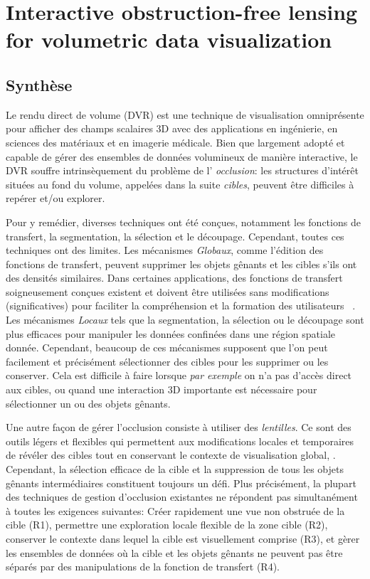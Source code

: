 \chapter{Interactive obstruction-free lensing for volumetric data visualization}
\label{lensing}

\section{Synthèse}

Le rendu direct de volume (DVR) est une technique de visualisation omniprésente pour afficher des champs scalaires 3D avec des applications en ingénierie, en sciences des matériaux et en imagerie médicale. Bien que largement adopté et capable de gérer des ensembles de données volumineux de manière interactive, le DVR souffre intrinsèquement du problème de l' \emph{occlusion}: les structures d’intérêt situées au fond du volume, appelées dans la suite \emph{cibles}, peuvent être difficiles à repérer et/ou explorer.


Pour y remédier, diverses techniques ont été conçues, notamment les fonctions de transfert, la segmentation, la sélection et le découpage. Cependant, toutes ces techniques ont des limites. Les mécanismes \emph{Globaux}, comme l'édition des fonctions de transfert, peuvent supprimer les objets gênants et les cibles s'ils ont des densités similaires. Dans certaines applications, des fonctions de transfert soigneusement conçues existent et doivent être utilisées sans modifications (significatives) pour faciliter la compréhension et la formation des utilisateurs \, \cite{4276082}. Les mécanismes \emph{Locaux} tels que la segmentation, la sélection ou le découpage sont plus efficaces pour manipuler les données confinées dans une région spatiale donnée. Cependant, beaucoup de ces mécanismes supposent que l'on peut facilement et précisément sélectionner des cibles pour les supprimer ou les conserver. Cela est difficile à faire lorsque \emph{par exemple} on n’a pas d’accès direct aux cibles, ou quand une interaction 3D importante est nécessaire pour sélectionner un ou des objets gênants.

Une autre façon de gérer l'occlusion consiste à utiliser des \emph{lentilles}. Ce sont des outils légers et flexibles qui permettent aux modifications locales et temporaires de révéler des cibles tout en conservant le contexte de visualisation global, \cite{595268, CGF:CGF12871, 6327262}. Cependant, la sélection efficace de la cible et la suppression de tous les objets gênants intermédiaires constituent toujours un défi. Plus précisément, la plupart des techniques de gestion d'occlusion existantes ne répondent pas simultanément à toutes les exigences suivantes: Créer rapidement une vue non obstruée de la cible (R1), permettre une exploration locale flexible de la zone cible (R2), conserver le contexte dans lequel la cible est visuellement comprise (R3), et gèrer les ensembles de données où la cible et les objets gênants ne peuvent pas être séparés par des manipulations de la fonction de transfert (R4).

